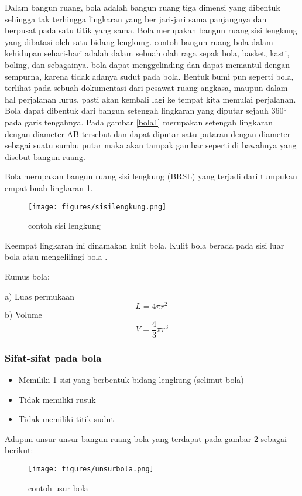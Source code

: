 Dalam bangun ruang, bola adalah bangun ruang tiga dimensi yang dibentuk sehingga tak terhingga lingkaran yang ber jari-jari sama panjangnya dan berpusat pada satu titik yang sama. Bola merupakan bangun ruang sisi lengkung yang dibatasi oleh satu bidang lengkung.
contoh bangun ruang bola dalam kehidupan sehari-hari adalah dalam sebuah olah raga sepak bola, basket, kasti, boling, dan sebagainya. bola dapat menggelinding dan dapat memantul dengan sempurna, karena tidak adanya sudut pada bola. 
Bentuk bumi pun seperti bola, terlihat pada sebuah dokumentasi dari pesawat ruang angkasa, maupun dalam hal perjalanan lurus, pasti akan kembali lagi ke tempat kita memulai perjalanan.
Bola dapat dibentuk dari bangun setengah lingkaran yang diputar sejauh 360° pada garis tengahnya. 
Pada gambar  \ref{bola1} merupakan setengah lingkaran dengan diameter AB  tersebut dan dapat diputar satu putaran dengan diameter sebagai suatu sumbu putar maka akan tampak gambar seperti di bawahnya yang disebut bangun ruang.


Bola merupakan bangun ruang sisi lengkung (BRSL) yang terjadi dari tumpukan empat buah lingkaran \ref{sisilengkung}.
\begin{figure}[ht]
    \centering
\texttt{[image: figures/sisilengkung.png]}
    \caption{contoh sisi lengkung}
    \label{sisilengkung}
    \end{figure} 
Keempat lingkaran ini dinamakan kulit bola. Kulit bola berada pada sisi luar bola atau mengelilingi bola \cite{nurfarikhin2010hubungan}.

Rumus bola:

a) Luas permukaan
 \begin{equation}
     L = 4 \pi r^2 \,
\end{equation}
b) Volume
\begin{equation}
     V = \frac{4}{3}\pi r^3
\end{equation}
\subsubsection{Sifat-sifat pada bola}
\begin{itemize} 
\item Memiliki 1 sisi yang berbentuk bidang lengkung (selimut bola) 
\item Tidak memiliki rusuk 
\item Tidak memiliki titik sudut
 \end{itemize}
Adapun unsur-unsur bangun ruang bola yang terdapat pada gambar \ref{unsur bola} sebagai berikut:
\begin{figure}[ht]
    \centerline{\texttt{[image: figures/unsurbola.png]}}
    \caption{contoh usur bola}
    \label{unsur bola}
    \end{figure}

